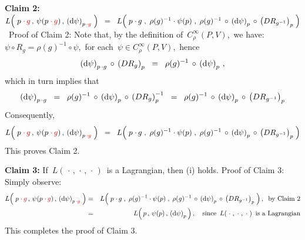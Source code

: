 \vskip 0.4cm
\noindent
\textbf{Claim 2:}\;
$
L\!\left(\;
    \overset{{\color{white}1}}{p{\color{red}\;\cdot\,g}}
    \,,\,
    \psi(p{\color{red}\;\cdot\,g})
    \,,\,
    \left(\d\psi\right)_{p{\color{red}\,\cdot g}}
    \;\right)
\;\; = \;\;
    L\!\left(\;
        \overset{{\color{white}1}}{p{\color{black}\;\cdot\,g}}
        \;,\;
        \rho(g)^{-1} \cdot \psi(p)
        \;,\;
        \rho(g)^{-1} \,\circ\, \left(\d\psi\right)_{p} \,\circ\, \left(DR_{g^{-1}}\right)_{p}
        \;\right)
$\,
\vskip 0.1cm
\noindent
Proof of Claim 2:\;
Note that, by the definition of \,$C^{\infty}_{\rho}(P,V)$,\,
we have:
\,$\psi \circ R_{g} = \rho(g)^{-1} \circ \psi$,\,
for each \,$\psi \in C^{\infty}_{\rho}(P,V)$,\,
hence
\begin{equation*}
\left(\textnormal{d}\psi\right)_{p{\color{black}\,\cdot g}} \,\circ\, \left(DR_{g}\right)_{p}
\;\; = \;\;
    \rho(g)^{-1} \,\circ\, \left(\textnormal{d}\psi\right)_{p}\,,
\end{equation*}
which in turn implies that
\begin{equation*}
\left(\textnormal{d}\psi\right)_{p{\color{black}\,\cdot g}} 
\;\; = \;\;
    \rho(g)^{-1} \,\circ\, \left(\textnormal{d}\psi\right)_{p} \,\circ\, \left(DR_{g}\right)_{p}^{-1}
\;\; = \;\;
    \rho(g)^{-1} \,\circ\, \left(\textnormal{d}\psi\right)_{p} \,\circ\, \left(DR_{g^{-1}}\right)_{p}
\end{equation*}
Consequently,
\begin{equation*}
L\!\left(\;
    \overset{{\color{white}1}}{p{\color{red}\;\cdot\,g}}
    \,,\,
    \psi(p{\color{red}\;\cdot\,g})
    \,,\,
    \left(\d\psi\right)_{p{\color{red}\,\cdot g}}
    \;\right)
\;\; = \;\;
    L\!\left(\;
        \overset{{\color{white}1}}{p{\color{black}\;\cdot\,g}}
        \;,\;
        \rho(g)^{-1} \cdot \psi(p)
        \;,\;
        \rho(g)^{-1} \,\circ\, \left(\d\psi\right)_{p} \,\circ\, \left(DR_{g^{-1}}\right)_{p}
        \;\right)
\end{equation*}
This proves Claim 2.

\vskip 0.4cm
\noindent
\textbf{Claim 3:}\;
If \,$L(\,\cdot\,,\,\cdot\,,\,\cdot\,)$\, is a Lagrangian,
then (i) holds.
\vskip 0.1cm
\noindent
Proof of Claim 3:\;
Simply observe:
\begin{eqnarray*}
L\!\left(\;
    \overset{{\color{white}1}}{p{\color{red}\;\cdot\,g}}
    \,,\,
    \psi(p{\color{red}\;\cdot\,g})
    \,,\,
    \left(\d\psi\right)_{p{\color{red}\,\cdot g}}
    \;\right)
& = &
    L\!\left(\;
        \overset{{\color{white}1}}{p{\color{black}\;\cdot\,g}}
        \;,\;
        \rho(g)^{-1} \cdot \psi(p)
        \;,\;
        \rho(g)^{-1} \,\circ\, \left(\d\psi\right)_{p} \,\circ\, \left(DR_{g^{-1}}\right)_{p}
        \;\right),
    \;\;
    \textnormal{by Claim 2}
\\
& = &
	L\!\left(\,
	    \overset{{\color{white}1}}{p}
	    \,,\,
	    \psi(p)
	    \,,\,
	    \left(\d\psi\right)_{p}
	    \,\right),
	\quad
	\textnormal{since \,$L(\;\cdot\;,\;\cdot\;,\;\cdot\;)$\, is a Lagrangian}
\end{eqnarray*}
This completes the proof of Claim 3.

